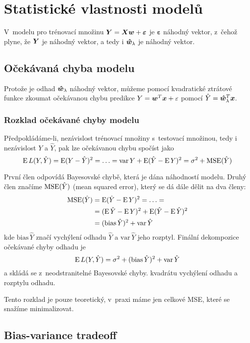 \section{Statistické vlastnosti modelů}

V~modelu pro trénovací množinu $\bm{Y} = \bm{X}\bm{w} + \bm{\varepsilon}$ je $\bm{\varepsilon}$ náhodný vektor, z~čehož plyne, že $\bm{Y}$ je náhodný vektor, a tedy i $\bm{\hat{w}}_\lambda$ je náhodný vektor.

\subsection{Očekávaná chyba modelu}

Protože je odhad $\bm{\hat{w}}_\lambda$ náhodný vektor, můžeme pomocí kvadratické ztrátové funkce zkoumat očekávanou chybu predikce $Y = \bm{w}^T\bm{x} + \varepsilon$ pomocí $\hat{Y} = \bm{\hat{w}}_\lambda^T \bm{x}$.

\subsubsection{Rozklad očekávané chyby modelu}

Předpokládáme-li, nezávislost trénovací množiny s~testovací množinou, tedy i nezávislost $Y$ a $\hat{Y}$, pak lze očekávanou chybu spočíst jako
\[
    \operatorname{E} L(Y, \hat{Y}) = \operatorname{E} (Y - \hat{Y})^2 = \ldots
    = \textrm{var}\,Y + \operatorname{E} (\hat{Y} - \operatorname{E} Y)^2
    = \sigma^2 + \operatorname{MSE}(\hat{Y})
\]

První člen odpovídá Bayesovské chybě, která je dána náhodností modelu. Druhý člen značíme $\operatorname{MSE}(\hat{Y})$ (mean squared error), který se dá dále dělit na dva členy:
\begin{align*}
    \operatorname{MSE}(\hat{Y}) & = \operatorname{E} (\hat{Y} - \operatorname{E} Y)^2 = \ldots =                 \\
                  & = (\operatorname{E}\hat{Y} - \operatorname{E} Y)^2 + \operatorname{E}(\hat{Y} - \operatorname{E}\hat{Y})^2 \\
                  & = (\text{bias}\,\hat{Y})^2 + \text{var}\,\hat{Y}
\end{align*}
kde $\text{bias}\,\hat{Y}$ značí vychýlení odhadu $\hat{Y}$ a $\text{var}\,\hat{Y}$ jeho rozptyl. Finální dekompozice očekávané chyby odhadu je
\[
    \operatorname{E} L(Y, \hat{Y}) = \sigma^2 + (\text{bias}\,\hat{Y})^2 + \text{var}\,\hat{Y}
\]
a skládá se z~neodstranitelné Bayesovské chyby. kvadrátu vychýlení odhadu a rozptylu odhadu.

Tento rozklad je pouze teoretický, v~praxi máme jen celkové MSE, které se snažíme minimalizovat.

\subsection{Bias-variance tradeoff}

